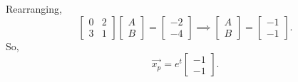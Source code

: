 Rearranging,
\begin{equation*}
	\begin{bmatrix}
		0 & 2 \\
		3 & 1
	\end{bmatrix}\begin{bmatrix}
		A \\
		B
	\end{bmatrix} = \begin{bmatrix}
		-2 \\
		-4
	\end{bmatrix} \implies \begin{bmatrix}
		A \\
		B
	\end{bmatrix} = \begin{bmatrix}
		-1 \\
		-1
	\end{bmatrix}.
\end{equation*}
So,
\begin{equation*}
	\vec{x_p} = e^t\begin{bmatrix}
		-1 \\
		-1
	\end{bmatrix}.
\end{equation*}

